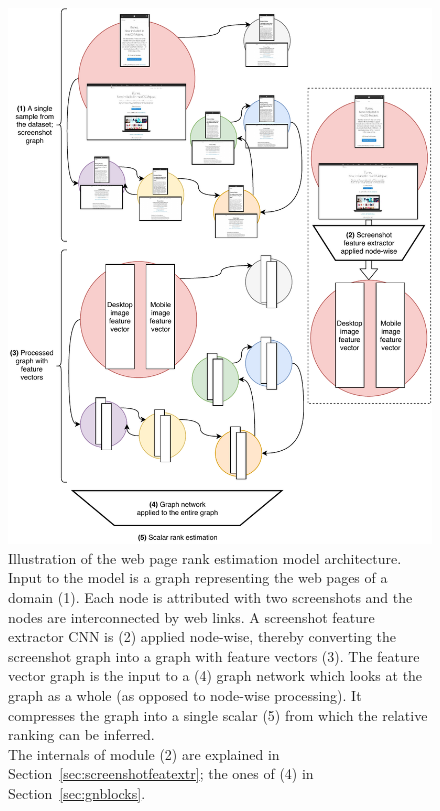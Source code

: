 \begin{figure}
    \centering
    \includegraphics[scale=0.64]{resources/model-architecture}
    \caption[Illustration of the model architecture]{Illustration of the web page rank estimation model architecture. Input to the model is a graph representing the web pages of a domain (1). Each node is attributed with two screenshots and the nodes are interconnected by web links. A screenshot feature extractor CNN is (2) applied node-wise, thereby converting the screenshot graph into a graph with feature vectors (3). The feature vector graph is the input to a (4) graph network which looks at the graph as a whole (as opposed to node-wise processing). It compresses the graph into a single scalar (5) from which the relative ranking can be inferred.\\
    The internals of module (2) are explained in Section~\ref{sec:screenshotfeatextr}; the ones of (4) in Section~\ref{sec:gnblocks}.}
    \label{fig:methodcomponents}
\end{figure}

